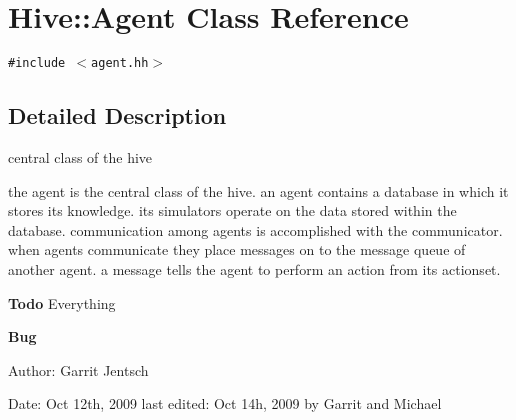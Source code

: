 \section{Hive::Agent Class Reference}
\label{classHive_1_1Agent}
{\tt \#include $<$agent.hh$>$}



\subsection{Detailed Description}
central class of the hive 

the agent is the central class of the hive. an agent contains a database in which it stores its knowledge. its simulators operate on the data stored within the database. communication among agents is accomplished with the communicator. when agents communicate they place messages on to the message queue of another agent. a message tells the agent to perform an action from its actionset.

\begin{Desc}
\item[{\bf Todo}]Everything\end{Desc}
\begin{Desc}
\item[{\bf Bug}]\end{Desc}
\begin{Desc}
\item[Author:]Garrit Jentsch\end{Desc}
\begin{Desc}
\item[Date:]Oct 12th, 2009 last edited: Oct 14h, 2009 by Garrit and Michael \end{Desc}
